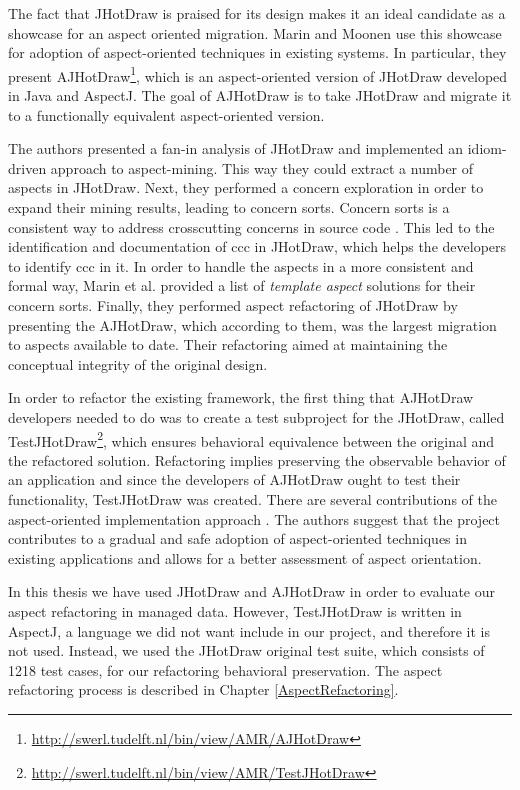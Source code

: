 The fact that JHotDraw is praised for its design makes it an ideal candidate as a showcase for an aspect oriented migration. 
Marin and Moonen \cite{marinajhotdraw} use this showcase for adoption of aspect-oriented techniques in existing systems. 
In particular, they present AJHotDraw\footnote{\url{http://swerl.tudelft.nl/bin/view/AMR/AJHotDraw}}, which is an aspect-oriented version of JHotDraw developed in Java and AspectJ. 
The goal of AJHotDraw is to take JHotDraw and migrate it to a functionally equivalent aspect-oriented version. 

The authors presented a fan-in analysis of JHotDraw \cite{marin2004identifying} and implemented an idiom-driven approach to aspect-mining. 
This way they could extract a number of aspects in JHotDraw. 
Next, they performed a concern exploration in order to expand their mining results, leading to concern sorts.
Concern sorts is a consistent way to address crosscutting concerns in source code \cite{marin2005classification}.
This led to the identification and documentation of \ac{ccc} in JHotDraw, which helps the developers to identify \ac{ccc} in it.
In order to handle the aspects in a more consistent and formal way, Marin et al. provided a list of \textit{template aspect} solutions for their concern sorts.
Finally, they performed aspect refactoring of JHotDraw by presenting the AJHotDraw, which according to them, was the largest migration to aspects available to date.
Their refactoring aimed at maintaining the conceptual integrity of the original design.

In order to refactor the existing framework, the first thing that AJHotDraw developers needed to do was to create a test subproject for the JHotDraw, called TestJHotDraw\footnote{\url{http://swerl.tudelft.nl/bin/view/AMR/TestJHotDraw}}, which ensures behavioral equivalence between the original and the refactored solution. 
Refactoring implies preserving the observable behavior of an application \cite{fowler2009refactoring} and since the developers of AJHotDraw ought to test their functionality, TestJHotDraw was created. 
There are several contributions of the aspect-oriented implementation approach \cite{marinajhotdraw}. 
The authors suggest that the project contributes to a gradual and safe adoption of aspect-oriented techniques in existing applications and allows for a better assessment of aspect orientation.

In this thesis we have used JHotDraw and AJHotDraw in order to evaluate our aspect refactoring in managed data.
However, TestJHotDraw is written in AspectJ, a language we did not want include in our project, and therefore it is not used.
Instead, we used the JHotDraw original test suite, which consists of 1218 test cases, for our refactoring behavioral preservation.
The aspect refactoring process is described in Chapter \ref{AspectRefactoring}.

